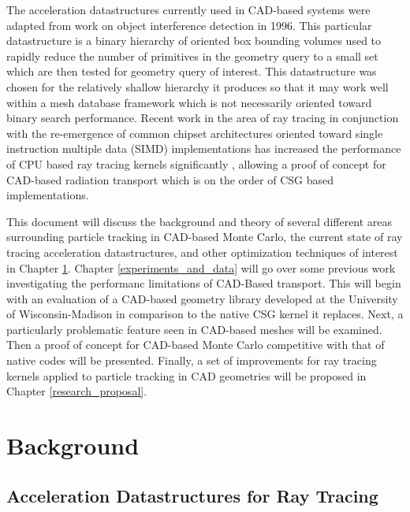 \documentclass[12pt, a4paper]{article}
\begin{document}
The acceleration datastructures currently used in CAD-based systems were adapted from work on object interference detection in 1996\cite{gottschalk1996obbtree}. This particular datastructure is a binary hierarchy of oriented box bounding volumes used to rapidly reduce the number of primitives in the geometry query to a small set which are then tested for geometry query of interest. This datastructure was chosen for the relatively shallow hierarchy it produces so that it may work well within a mesh database framework which is not necessarily oriented toward binary search performance. Recent work in the area of ray tracing in conjunction with the re-emergence of common chipset architectures oriented toward single instruction multiple data (SIMD) implementations has increased the performance of CPU based ray tracing kernels significantly \cite{Wald_2008}, allowing a proof of concept for CAD-based radiation transport which is on the order of CSG based implementations.

This document will discuss the background and theory of several different areas surrounding particle tracking in CAD-based Monte Carlo, the current state of ray tracing acceleration datastructures, and other optimization techniques of interest in Chapter \ref{background}. Chapter \ref{experiments_and_data} will go over some previous work investigating the performanc limitations of CAD-Based transport. This will begin with an evaluation of a CAD-based geometry library developed at the University of Wisconsin-Madison in comparison to the native CSG kernel it replaces. Next, a particularly problematic feature seen in CAD-based meshes will be examined. Then a proof of concept for CAD-based Monte Carlo competitive with that of native codes will be presented. Finally, a set of improvements for ray tracing kernels applied to particle tracking in CAD geometries will be proposed in Chapter \ref{research_proposal}.


\section{Background}%
\label{background}


\subsection{Acceleration Datastructures for Ray Tracing}
\label{subsec:accel_datastructures}
\end{document}

